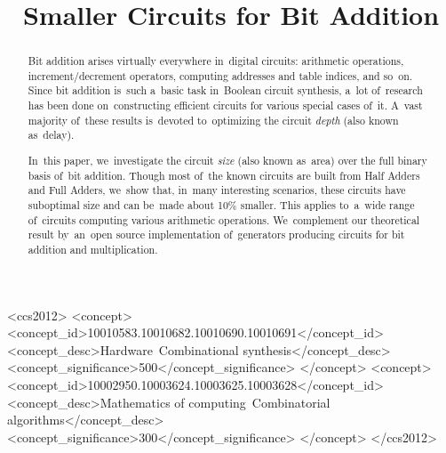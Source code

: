 \documentclass[sigconf, review, anonymous]{acmart}
\begin{document}
\begin{CCSXML}
	<ccs2012>
	<concept>
	<concept_id>10010583.10010682.10010690.10010691</concept_id>
	<concept_desc>Hardware~Combinational synthesis</concept_desc>
	<concept_significance>500</concept_significance>
	</concept>
	<concept>
	<concept_id>10002950.10003624.10003625.10003628</concept_id>
	<concept_desc>Mathematics of computing~Combinatorial algorithms</concept_desc>
	<concept_significance>300</concept_significance>
	</concept>
	</ccs2012>
\end{CCSXML}



\title{Smaller Circuits for Bit Addition}

\begin{abstract}
    Bit addition arises virtually everywhere in~digital circuits:
    arithmetic operations,
    increment/decrement operators,
    computing addresses and table indices, and so~on.
    Since bit addition is~such a~basic task in~Boolean circuit synthesis,
    a~lot of~research has been done on~constructing efficient circuits
    for various special cases of~it. A~vast majority of~these results is~devoted to~optimizing the circuit \emph{depth} (also known as~delay).

    In~this paper, we~investigate the circuit \emph{size} (also known as~area)
    over the full binary basis of~bit addition. Though most of~the known circuits are built from Half Adders and Full Adders,
    we~show that, in~many interesting scenarios, these circuits have suboptimal size
    and can be~made about 10\% smaller. This applies to~a~wide range
    of~circuits computing various arithmetic operations.
    We~complement our theoretical result by~an~open source implementation
    of~generators producing circuits for bit addition and multiplication.
\end{abstract}



\maketitle
\end{document}
